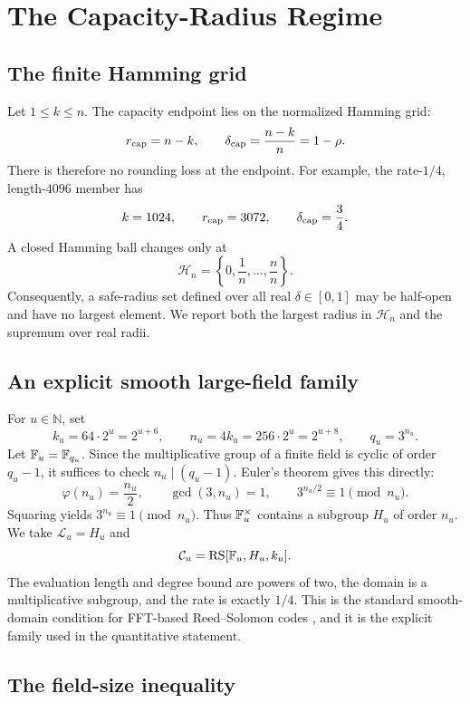\section{The Capacity-Radius Regime}

\subsection{The finite Hamming grid}

Let \(1\le k\le n\).  The capacity endpoint lies on the normalized
Hamming grid:
\[
  r_{\mathrm{cap}}=n-k,
  \qquad
  \delta_{\mathrm{cap}}=\frac{n-k}{n}=1-\rho.
\]
There is therefore no rounding loss at the endpoint.  For example, the
rate-\(1/4\), length-\(4096\) member has
\[
  k=1024,\qquad r_{\mathrm{cap}}=3072,\qquad
  \delta_{\mathrm{cap}}=\frac34.
\]
A closed Hamming ball changes only at
\[
  \mathcal H_n=\left\{0,\frac1n,\ldots,\frac nn\right\}.
\]
Consequently, a safe-radius set defined over all real
\(\delta\in[0,1]\) may be half-open and have no largest element.  We report
both the largest radius in \(\mathcal H_n\) and the supremum over real radii.

\subsection{An explicit smooth large-field family}
\label{sec:explicit-family}

For \(u\in\mathbb N\), set
\[
  k_u=64\cdot2^u=2^{u+6},
  \qquad
  n_u=4k_u=256\cdot2^u=2^{u+8},
  \qquad
  q_u=3^{n_u}.
\]
Let \(\mathbb{F}_u=\mathbb F_{q_u}\).  Since the multiplicative group of a finite
field is cyclic of order \(q_u-1\), it suffices to check
\(n_u\mid(q_u-1)\).  Euler's theorem gives this directly:
\[
  \varphi(n_u)=\frac{n_u}{2},
  \qquad
  \gcd(3,n_u)=1,
  \qquad
  3^{n_u/2}\equiv1\pmod{n_u}.
\]
Squaring yields \(3^{n_u}\equiv1\pmod{n_u}\).  Thus
\(\mathbb{F}_u^\times\) contains a subgroup \(H_u\) of order \(n_u\).  We take
\(\mathcal L_u=H_u\) and
\[
  \mathcal C_u=\operatorname{RS}[\mathbb{F}_u,H_u,k_u].
\]
The evaluation length and degree bound are powers of two, the domain is a
multiplicative subgroup, and the rate is exactly \(1/4\).  This is the
standard smooth-domain condition for FFT-based Reed--Solomon codes
\cite{arnonChiesaFenziYogev2024}, and it is the explicit family used in the
quantitative statement.

\subsection{The field-size inequality}
\label{sec:field-inequality}

